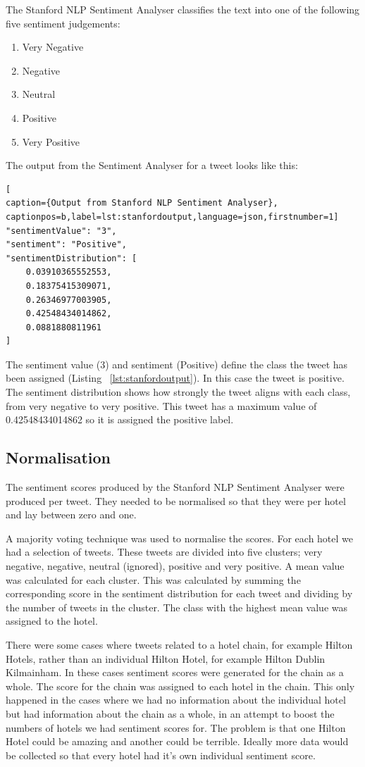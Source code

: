 The Stanford NLP Sentiment Analyser classifies the text into one of the following five sentiment judgements: 
\begin{enumerate}
    \item Very Negative
    \item Negative
    \item Neutral
    \item Positive
    \item Very Positive
\end{enumerate}

The output from the Sentiment Analyser for a tweet looks like this:

\begin{lstlisting}[
caption={Output from Stanford NLP Sentiment Analyser},
captionpos=b,label=lst:stanfordoutput,language=json,firstnumber=1]
"sentimentValue": "3",
"sentiment": "Positive",
"sentimentDistribution": [
    0.03910365552553,
    0.18375415309071,
    0.26346977003905,
    0.42548434014862,
    0.0881880811961
]
\end{lstlisting}

The sentiment value (3) and sentiment (Positive) define the class the tweet has been assigned (Listing ~\ref{lst:stanfordoutput}). In this case the tweet is positive. The sentiment distribution shows how strongly the tweet aligns with each class, from very negative to very positive. This tweet has a maximum value of 0.42548434014862 so it is assigned the positive label.

\subsection{Normalisation}

The sentiment scores produced by the Stanford NLP Sentiment Analyser were produced per tweet. They needed to be normalised so that they were per hotel and lay between zero and one.

A majority voting technique was used to normalise the scores. For each hotel we had a selection of tweets. These tweets are divided into five clusters; very negative, negative, neutral (ignored), positive and very positive. A mean value was calculated for each cluster. This was calculated by summing the corresponding score in the sentiment distribution for each tweet and dividing by the number of tweets in the cluster. The class with the highest mean value was assigned to the hotel.

There were some cases where tweets related to a hotel chain, for example Hilton Hotels, rather than an individual Hilton Hotel, for example Hilton Dublin Kilmainham. In these cases sentiment scores were generated for the chain as a whole. The score for the chain was assigned to each hotel in the chain. This only happened in the cases where we had no information about the individual hotel but had information about the chain as a whole, in an attempt to boost the numbers of hotels we had sentiment scores for. The problem is that one Hilton Hotel could be amazing and another could be terrible. Ideally more data would be collected so that every hotel had it's own individual sentiment score.

